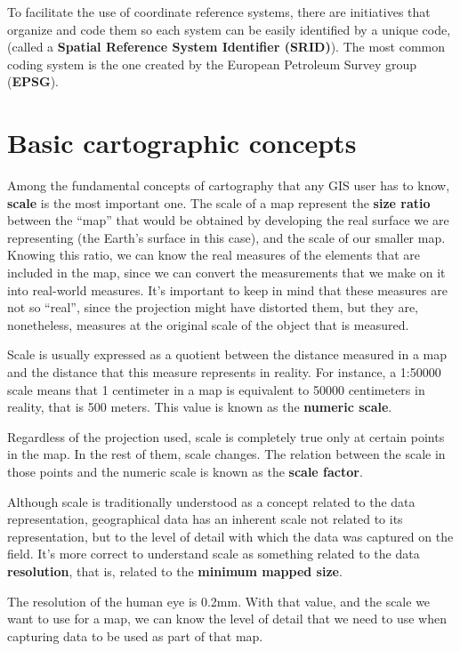 To facilitate the use of coordinate reference systems, there are initiatives that organize and code them so each system can be easily identified by a unique code, (called a \textbf{Spatial Reference System Identifier (SRID)}). The most common coding system is the one created by the European Petroleum Survey group (\textbf{EPSG}).


\section{Basic cartographic concepts}

Among the fundamental concepts of cartography that any GIS user has to know, \textbf{scale} is the most important one. The scale of a map represent the \textbf{size ratio} between the ``map'' that would be obtained by developing the real surface we are representing (the Earth's surface in this case), and the scale of our smaller map. Knowing this ratio, we can know the real measures of the elements that are included in the map, since we can convert the measurements that we make on it into real-world measures. It's important to keep in mind that these measures are not so ``real'', since the projection might have distorted them, but they are, nonetheless, measures at the original scale of the object that is measured.

Scale is usually expressed as a quotient between the distance measured in a map and the distance that this measure represents in reality. For instance, a 1:50000 scale means that 1 centimeter in a map is equivalent to 50000 centimeters in reality, that is 500 meters. This value is known as the \textbf{numeric scale}.

Regardless of the projection used, scale is completely true only at certain points in the map. In the rest of them, scale changes. The relation between the scale in those points and the numeric scale is known as the \textbf{scale factor}.

Although scale is traditionally understood as a concept related to the data representation, geographical data has an inherent scale not related to its representation, but to the level of detail with which the data was captured on the field. It's more correct to understand scale as something related to the data \textbf{resolution}, that is, related to the \textbf{minimum mapped size}.

The resolution of the human eye is 0.2mm. With that value, and the scale we want to use for a map, we can know the level of detail that we need to use when capturing data to be used as part of that map. 

